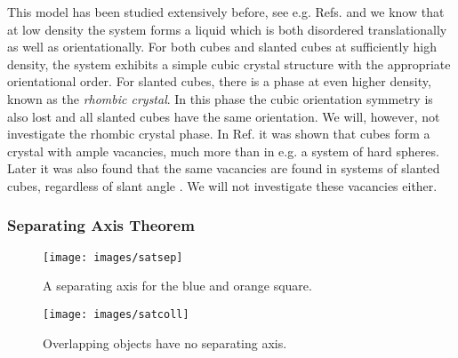 \documentclass[thesis]{subfiles}
\begin{document}
This model has been studied extensively before, see e.g. Refs. \cite{van2017phase, smallenburg2012vacancy, sharma2018disorder} and we know that at low density the system forms a liquid which is both disordered translationally as well as orientationally. For both cubes and slanted cubes at sufficiently high density, the system exhibits a simple cubic crystal structure with the appropriate orientational order. For slanted cubes, there is a phase at even higher density, known as the \emph{rhombic crystal}. In this phase the cubic orientation symmetry is also lost and all slanted cubes have the same orientation.  We will, however, not investigate the rhombic crystal phase. In Ref. \cite{smallenburg2012vacancy} it was shown that cubes form a crystal with ample vacancies, much more than in e.g. a system of hard spheres. Later it was also found that the same vacancies are found in systems of slanted cubes, regardless of slant angle \cite{van2017phase}. We will not investigate these vacancies either.

\subsubsection{Separating Axis Theorem}\label{subsec:sep ax thm}

\begin{wrapfigure}{r}{0.35\textwidth}
	\centering
	\vspace{-10pt}	\texttt{[image: images/satsep]}
	\caption{A separating axis for the blue and orange square.}\label{fig:satsep}\smallskip
	\texttt{[image: images/satcoll]}
	\caption{Overlapping objects have no separating axis.}\label{fig:satcoll}
	\vspace{-50pt}
\end{wrapfigure}
\end{document}
